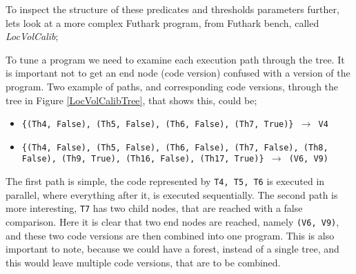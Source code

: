 \begin{center}
	\centering 
	
	\label{MatMultTreeFilled}
\end{center}
To inspect the structure of these predicates and thresholds parameters further, lets look at a more complex Futhark program, from Futhark bench, called \textit{LocVolCalib};
\begin{center}
	\centering
	
	\label{LocVolCalibTree}
\end{center}
\noindent To tune a program we need to examine each execution path through the tree. It is important not to get an end node (code version) confused with a version of the program. Two example of paths, and corresponding code versions, through the tree in Figure \ref{LocVolCalibTree}, that shows this, could be;
\begin{itemize}
	\item \texttt{\{(Th4, False), (Th5, False), (Th6, False), (Th7, True)\} $\to$ V4}
	\item \texttt{\{(Th4, False), (Th5, False), (Th6, False), (Th7, False), (Th8, False), (Th9, True), (Th16, False), (Th17, True)\} $\to$ (V6, V9)}
\end{itemize}  
The first path is simple, the code represented by \texttt{T4, T5, T6} is executed in parallel, where everything after it, is executed sequentially. The second path is more interesting, \texttt{T7} has two child nodes, that are reached with a false comparison. Here it is clear that two end nodes are reached, namely \texttt{(V6, V9)}, and these two code versions are then combined into one program. This is also important to note, because we could have a forest, instead of a single tree, and this would leave multiple code versions, that are to be combined.




